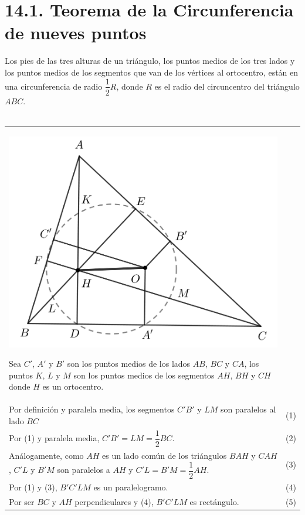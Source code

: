 \documentclass[12pt,a4paper, oneside]{book}
\begin{document}
\section{14.1. Teorema de la Circunferencia de nueves puntos}
Los pies de las tres alturas de un triángulo, los puntos medios de los tres lados y los puntos medios de los segmentos que van de los vértices al ortocentro, están en una circunferencia de radio $\dfrac{1}{2}R$, donde $R$ es el radio del circuncentro del triángulo $ABC$.\\\\
\begin{tabular}{p{15.9 cm} p{1cm}}
\\
\begin{center}
\includegraphics[scale=0.7]{Imagenes/circunferencia nueve.png} 
\end{center}
Sea $C'$, $A'$ y $B'$ son los puntos medios de los lados $AB$, $BC$ y $CA$, los puntos $K$, $L$ y $M$ son los puntos medios de los segmentos $AH$, $BH$ y $CH$ donde $H$ es un ortocentro. 
\\Por definición y paralela media, los segmentos $C'B'$ y $LM$ son paralelos al lado $BC$ &(1)
\\Por (1) y paralela media, $C'B'=LM=\dfrac{1}{2} BC$. &(2)
\\Análogamente, como $AH$ es un lado común de los triángulos $BAH$ y $CAH$, $C'L$ y $B'M$ son paralelos a $AH$ y $C'L=B'M=\dfrac{1}{2} AH$. &\medskip (3)
\\Por (1) y (3), $B'C'LM$ es un paralelogramo. &(4)
\\Por ser $BC$ y $AH$ perpendiculares y (4), $B'C'LM$ es rectángulo. &(5)

\end{tabular}
\end{document}

